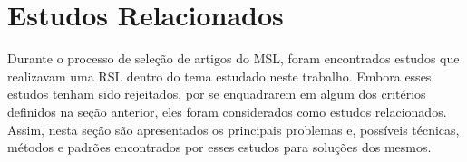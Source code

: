 \section{Estudos Relacionados}

Durante o processo de seleção de artigos do MSL, foram encontrados estudos que realizavam uma RSL dentro do tema estudado neste trabalho.
Embora esses estudos tenham sido rejeitados, por se enquadrarem em algum dos critérios definidos na seção anterior, eles foram considerados como estudos relacionados.
Assim, nesta seção são apresentados os principais problemas e, possíveis técnicas, métodos e padrões encontrados por esses estudos para soluções dos mesmos.